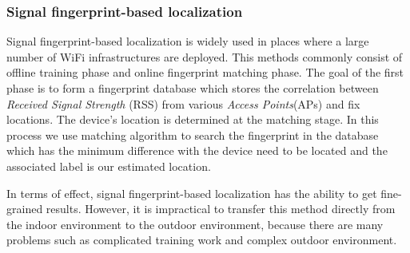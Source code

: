 \subsubsection{Signal fingerprint-based localization}
Signal fingerprint-based localization is widely used in places where a large number of WiFi infrastructures are deployed. This methods commonly consist of offline training phase
and online fingerprint matching phase. The goal of the first phase is to form a fingerprint database which stores the correlation between \textit{Received Signal Strength} (RSS) from
various \textit{Access Points}(APs) and fix locations. The device's location is determined at the matching stage. In this process we use matching algorithm to search the fingerprint
in the database which has the minimum difference with the device need to be located and the associated label is our estimated location.

In terms of effect, signal fingerprint-based localization has the ability to get fine-grained results. However, it is impractical to transfer this method directly from the indoor environment to the
outdoor environment, because there are many problems such as complicated training work and complex outdoor environment.






